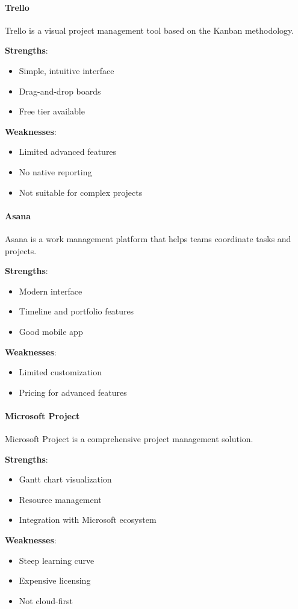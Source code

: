\documentclass[12pt,a4paper,twoside]{book}
\newcommand{\subsubsubsection}[1]{\paragraph{#1}}
\begin{document}
\subsubsubsection{Trello}
Trello is a visual project management tool based on the Kanban methodology.

\textbf{Strengths}:
\begin{itemize}
    \item Simple, intuitive interface
    \item Drag-and-drop boards
    \item Free tier available
\end{itemize}

\textbf{Weaknesses}:
\begin{itemize}
    \item Limited advanced features
    \item No native reporting
    \item Not suitable for complex projects
\end{itemize}

\subsubsubsection{Asana}
Asana is a work management platform that helps teams coordinate tasks and projects.

\textbf{Strengths}:
\begin{itemize}
    \item Modern interface
    \item Timeline and portfolio features
    \item Good mobile app
\end{itemize}

\textbf{Weaknesses}:
\begin{itemize}
    \item Limited customization
    \item Pricing for advanced features
\end{itemize}

\subsubsubsection{Microsoft Project}
Microsoft Project is a comprehensive project management solution.

\textbf{Strengths}:
\begin{itemize}
    \item Gantt chart visualization
    \item Resource management
    \item Integration with Microsoft ecosystem
\end{itemize}

\textbf{Weaknesses}:
\begin{itemize}
    \item Steep learning curve
    \item Expensive licensing
    \item Not cloud-first
\end{itemize}
\end{document}
